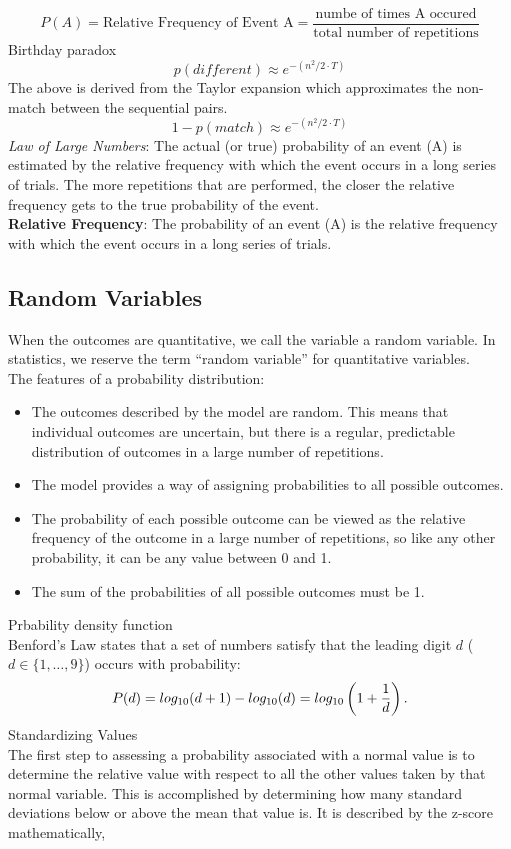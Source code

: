 \documentclass[10pt, a4paper]{article}
\begin{document}
\[
    P(A)=\text{Relative Frequency of Event A} =\frac{\text{numbe of times A occured}}{\text{total number of repetitions}}
\]
Birthday paradox
\[
\displaystyle{p(different) \approx e^{-(n^2 / 2 \cdot T)}}
\]
The above is derived from the Taylor expansion which approximates the non-match between the sequential pairs.
\[
\displaystyle{1 - p(match) \approx e^{-(n^2 / 2 \cdot T)}}
\]
\emph{Law of Large Numbers}: The actual (or true) probability of an event (A) is estimated by the relative frequency with which the event occurs in a long series of trials. The more repetitions that are performed, the closer the relative frequency gets to the true probability of the event.\\
\textbf{Relative Frequency}: 
The probability of an event (A) is the relative frequency with which the event occurs in a long series of trials.
\subsection{Random Variables}
When the outcomes are quantitative, we call the variable a random variable. In statistics, we reserve the term ``random variable'' for quantitative variables. \\
The features of a probability distribution:
\begin{itemize}
\item The outcomes described by the model are random. This means that individual outcomes are uncertain, but there is a regular, predictable distribution of outcomes in a large number of repetitions.
\item The model provides a way of assigning probabilities to all possible outcomes.
\item The probability of each possible outcome can be viewed as the relative frequency of the outcome in a large number of repetitions, so like any other probability, it can be any value between 0 and 1.
\item The sum of the probabilities of all possible outcomes must be 1.
\end{itemize}
Prbability density function \\
Benford's Law states that a set of numbers satisfy that the leading digit $d$ ($d\in \{1,\dots,9\}$) occurs with probability:
\[
  P(d)=log_{10}(d+1)-log_{10}(d)=log_{10}\left(1+{1\over d}\right).
\]
Standardizing Values\\
The first step to assessing a probability associated with a normal value is to determine the relative value with respect to all the other values taken by that normal variable. This is accomplished by determining how many standard deviations below or above the mean that value is. It is described by the z-score mathematically,
\end{document}
